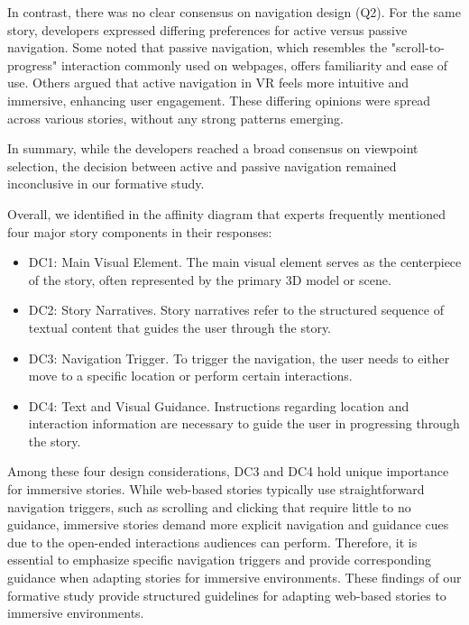 In contrast, there was no clear consensus on navigation design (Q2). For the same story, developers expressed differing preferences for active versus passive navigation. Some noted that passive navigation, which resembles the "scroll-to-progress" interaction commonly used on webpages, offers familiarity and ease of use. Others argued that active navigation in VR feels more intuitive and immersive, enhancing user engagement. These differing opinions were spread across various stories, without any strong patterns emerging.

In summary, while the developers reached a broad consensus on viewpoint selection, the decision between active and passive navigation remained inconclusive in our formative study.

Overall, we identified in the affinity diagram that experts frequently mentioned four major story components in their responses:
\begin{itemize}
    \item DC1: Main Visual Element. The main visual element serves as the centerpiece of the story, often represented by the primary 3D model or scene.
    \item DC2: Story Narratives. Story narratives refer to the structured sequence of textual content that guides the user through the story.
    \item DC3: Navigation Trigger. To trigger the navigation, the user needs to either move to a specific location or perform certain interactions.
    \item DC4: Text and Visual Guidance. Instructions regarding location and interaction information are necessary to guide the user in progressing through the story.
\end{itemize}

{Among these four design considerations, DC3 and DC4 hold unique importance for immersive stories. While web-based stories typically use straightforward navigation triggers, such as scrolling and clicking that require little to no guidance, immersive stories demand more explicit navigation and guidance cues due to the open-ended interactions audiences can perform. Therefore, it is essential to emphasize specific navigation triggers and provide corresponding guidance when adapting stories for immersive environments.}
These findings of our formative study provide structured guidelines for adapting web-based stories to immersive environments.
